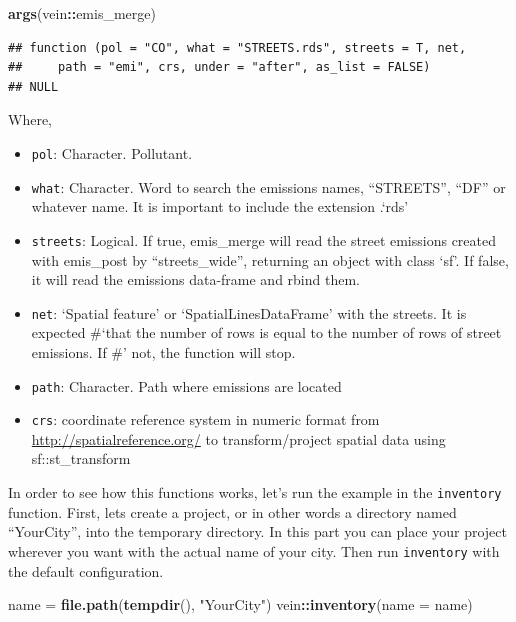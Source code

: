 \documentclass[12pt,graybox,envcountchap,sectrefs]{krantz}
\makeatletter
\newenvironment{Shaded}{\begin{snugshade}}{\end{snugshade}}
\newcommand{\KeywordTok}[1]{\textcolor[rgb]{0.13,0.29,0.53}{\textbf{#1}}}
\newcommand{\DataTypeTok}[1]{\textcolor[rgb]{0.13,0.29,0.53}{#1}}
\newcommand{\StringTok}[1]{\textcolor[rgb]{0.31,0.60,0.02}{#1}}
\newcommand{\OperatorTok}[1]{\textcolor[rgb]{0.81,0.36,0.00}{\textbf{#1}}}
\newcommand{\NormalTok}[1]{#1}
\providecommand{\tightlist}{%
  \setlength{\itemsep}{0pt}\setlength{\parskip}{0pt}}
\newenvironment{kframe}{%
\medskip{}
\setlength{\fboxsep}{.8em}
 \def\at@end@of@kframe{}%
 \ifinner\ifhmode%
  \def\at@end@of@kframe{\end{minipage}}%
  \begin{minipage}{\columnwidth}%
 \fi\fi%
 \def\FrameCommand##1{\hskip\@totalleftmargin \hskip-\fboxsep
 \colorbox{shadecolor}{##1}\hskip-\fboxsep
     \hskip-\linewidth \hskip-\@totalleftmargin \hskip\columnwidth}%
 \MakeFramed {\advance\hsize-\width
   \@totalleftmargin\z@ \linewidth\hsize
   \@setminipage}}%
 {\par\unskip\endMakeFramed%
 \at@end@of@kframe}
\renewenvironment{Shaded}{\begin{kframe}}{\end{kframe}}
\theoremstyle{definition}
\theoremstyle{definition}
\theoremstyle{definition}
\theoremstyle{remark}
\makeatother
\begin{document}
\begin{Shaded}
\begin{Highlighting}[]
\KeywordTok{args}\NormalTok{(vein}\OperatorTok{::}\NormalTok{emis_merge)}
\end{Highlighting}
\end{Shaded}

\begin{verbatim}
## function (pol = "CO", what = "STREETS.rds", streets = T, net, 
##     path = "emi", crs, under = "after", as_list = FALSE) 
## NULL
\end{verbatim}

Where,

\begin{itemize}
\tightlist
\item
  \texttt{pol}: Character. Pollutant.
\item
  \texttt{what}: Character. Word to search the emissions names,
  ``STREETS'', ``DF'' or whatever name. It is important to include the
  extension .`rds'
\item
  \texttt{streets}: Logical. If true, emis\_merge will read the street
  emissions created with emis\_post by ``streets\_wide'', returning an
  object with class `sf'. If false, it will read the emissions
  data-frame and rbind them.
\item
  \texttt{net}: `Spatial feature' or `SpatialLinesDataFrame' with the
  streets. It is expected \#`that the number of rows is equal to the
  number of rows of street emissions. If \#' not, the function will
  stop.
\item
  \texttt{path}: Character. Path where emissions are located
\item
  \texttt{crs}: coordinate reference system in numeric format from
  \url{http://spatialreference.org/} to transform/project spatial data
  using sf::st\_transform
\end{itemize}

In order to see how this functions works, let's run the example in the
\texttt{inventory} function. First, lets create a project, or in other
words a directory named ``YourCity'', into the temporary directory. In
this part you can place your project wherever you want with the actual
name of your city. Then run \texttt{inventory} with the default
configuration.

\begin{Shaded}
\begin{Highlighting}[]
\NormalTok{name =}\StringTok{ }\KeywordTok{file.path}\NormalTok{(}\KeywordTok{tempdir}\NormalTok{(), }\StringTok{"YourCity"}\NormalTok{)}
\NormalTok{vein}\OperatorTok{::}\KeywordTok{inventory}\NormalTok{(}\DataTypeTok{name =}\NormalTok{ name)}
\end{Highlighting}
\end{Shaded}
\end{document}
